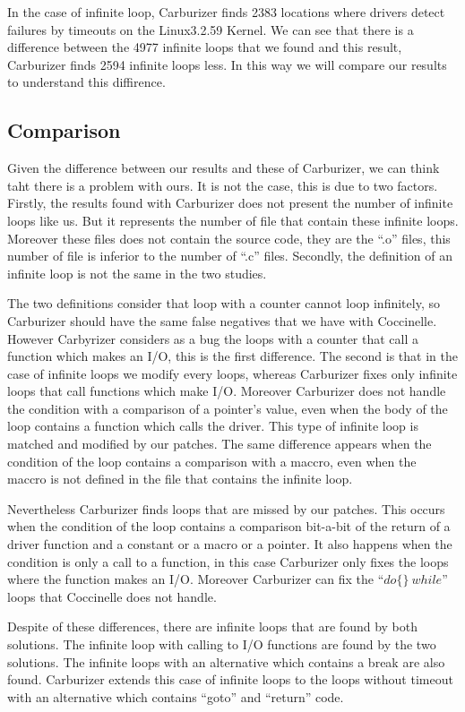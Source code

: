 \documentclass[a4paper,12pt]{article}
\begin{document}
In the case of infinite loop, Carburizer finds 2383 locations where drivers detect failures by timeouts on the Linux3.2.59 Kernel. 
We can see that there is a difference between the 4977 infinite loops that we found and this result, Carburizer finds 2594 infinite loops less. In this way we will compare our results to understand this diffirence.

\subsection{Comparison}
Given the difference between our results and these of Carburizer, we can think taht there is a problem with ours. It is not the case, this is due to two factors. Firstly, the results found with Carburizer does not present the number of infinite loops like us. But it represents the number of file that contain these infinite loops. Moreover these files does not contain the source code, they are the ``.o'' files, this number of file is inferior to the number of ``.c'' files. Secondly, the definition of an infinite loop is not the same in the two studies. 

The two definitions consider that loop with a counter cannot loop infinitely, so Carburizer should have the same false negatives that we have with Coccinelle. However Carbyrizer considers as a bug the loops with a counter that call a function which makes an I/O, this is the first difference. The second is that in the case of infinite loops we modify every loops, whereas Carburizer fixes only infinite loops that call functions which make I/O. Moreover Carburizer does not handle the condition with a comparison of a pointer's value, even when the body of the loop contains a function which calls the driver. This type of infinite loop is matched and modified by our patches. The same difference appears when the condition of the loop contains a comparison with a maccro, even when the maccro is not defined in the file that contains the infinite loop.

Nevertheless Carburizer finds loops that are missed by our patches. This occurs when the condition of the loop contains a comparison bit-a-bit of the return of a driver function and a constant or a macro or a pointer. It also happens when the condition is only a call to a function, in this case Carburizer only fixes the loops where the function makes an I/O. Moreover Carburizer can fix the ``$do\{\}\ while$'' loops that Coccinelle does not handle.

Despite of these differences, there are infinite loops that are found by both solutions. The infinite loop with calling to I/O functions are found by the two solutions. The infinite loops with an alternative which contains a break are also found. Carburizer extends this case of infinite loops to the loops without timeout with an alternative which contains ``goto'' and ``return'' code.
\end{document}
